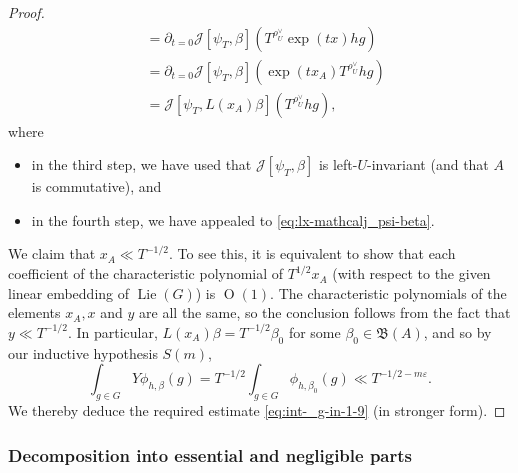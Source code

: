 \documentclass[reqno]{amsart}
\def\eps{\varepsilon}
\DeclareMathOperator{\Lie}{Lie}
\def\O{\operatorname{O}}
\theoremstyle{plain} \newtheorem{theorem} {Theorem}
\theoremstyle{definition} \newtheorem{definition} [theorem] {Definition}
\theoremstyle{itplain} %
\numberwithin{equation}{section}
\numberwithin{theorem}{section}
\begin{document}
\begin{proof}
\begin{align*}
    &=
      \partial_{t=0} \mathcal{J}[\psi_T, \beta](T^{\rho_U^\vee} \exp(t x) h g)
    \\
    &=
      \partial_{t=0} \mathcal{J}[\psi_T, \beta](\exp(t x_A) T^{\rho_U^\vee} h g)
    \\
    &=
      \mathcal{J}[\psi_T, L(x_A) \beta](T^{\rho_U^\vee} h g),
  \end{align*}
  where
  \begin{itemize}
  \item in the third step, we have used that $\mathcal{J}[\psi_T,\beta]$ is left-$U$-invariant (and that $A$ is commutative), and
  \item in the fourth step, we have appealed to \eqref{eq:lx-mathcalj_psi-beta}.
  \end{itemize}
  We claim that $x_A \ll T^{-1/2}$.  To see this, it is equivalent to show that each coefficient of the characteristic polynomial of $T^{1/2} x_A$ (with respect to the given linear embedding of $\Lie(G)$) is $\O(1)$.  The characteristic polynomials of the elements $x_A, x$ and $y$ are all the same, so the conclusion follows from the fact that $y \ll T^{-1/2}$.  In particular, $L(x_A) \beta = T^{-1/2} \beta_0$ for some $\beta_0 \in \mathfrak{B}(A)$, and so by our inductive hypothesis $S(m)$,
  \begin{equation*}
    \int _{g \in G} Y \phi_{h,\beta}(g) =
    T^{-1/2}
    \int _{g \in G} \phi_{h,\beta_0}(g) \ll T^{-1/2 - m \eps}.
  \end{equation*}
  We thereby deduce the required estimate \eqref{eq:int-_g-in-1-9} (in stronger form).
\end{proof}

\subsubsection{Decomposition into essential and negligible parts}
\end{document}
